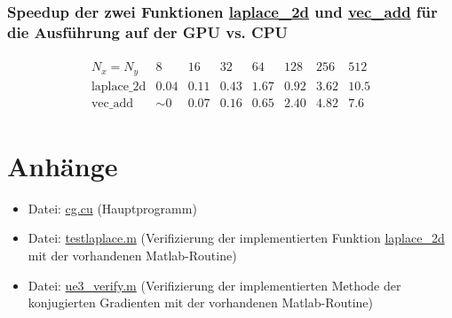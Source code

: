 \documentclass[%
	paper=A4,	%
	pagesize,	%
	DIV=calc,	%
	smallheadings,	%
	ngerman		%
]{scrartcl}
\begin{document}
\subsubsection*{Speedup der zwei Funktionen \url{laplace_2d} und \url{vec_add} für die Ausführung auf der GPU vs. CPU}
\begin{eqnarray} \nonumber
	\begin{array}{l|c|c|c|c|c|c|c}
 N_x=N_y & 8 & 16 & 32 & 64 & 128 & 256 & 512 \\ \hline
 \mbox{laplace\_2d} & 0.04 & 0.11 & 0.43 & 1.67 & 0.92 & 3.62 & 10.5 \\
 \mbox{vec\_add} & \sim 0 & 0.07 & 0.16 & 0.65 & 2.40 & 4.82 & 7.6
	\end{array}
\end{eqnarray}

\section*{Anhänge}
\begin{itemize}
	\item Datei: \url{cg.cu} (Hauptprogramm)
	\item Datei: \url{testlaplace.m} (Verifizierung der implementierten Funktion \url{laplace\_2d} mit der vorhandenen Matlab-Routine)
	\item Datei: \url{ue3_verify.m} (Verifizierung der implementierten Methode der konjugierten Gradienten mit der vorhandenen Matlab-Routine)
\end{itemize}
\end{document}
